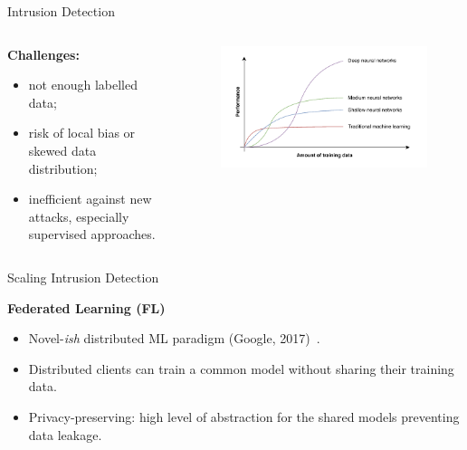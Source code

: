 \begin{frame}{Intrusion Detection}

  \begin{columns}
    \begin{column}{0.5\textwidth}
        \textbf{Challenges:}
        \begin{itemize}
          \item not enough labelled data;
          \item risk of local bias or skewed data distribution;
          \item inefficient against new attacks, especially \alert{supervised} approaches.
        \end{itemize}
    \end{column}

    \begin{column}{0.5\textwidth}
      \begin{figure}
        \centering
        \includegraphics[width=\linewidth]{figures/intro/ml-perf}
      \end{figure}
    \end{column}
  \end{columns}
\end{frame}

\begin{frame}{Scaling Intrusion Detection}

  \textbf{Federated Learning (FL)}
  
  \begin{itemize}
    \item Novel-\emph{ish} distributed ML paradigm (Google, 2017)~\cite{mcmahan_Communicationefficientlearningdeep_2017}.
    \item Distributed clients can train a common model without sharing their training data.
    \item Privacy-preserving: high level of abstraction for the shared models preventing data leakage.
  \end{itemize}
\end{frame}

